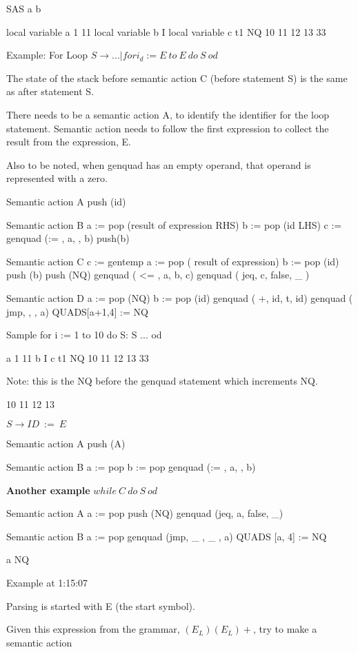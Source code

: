 \documentclass[11pt]{article}
\begin{document}
SAS
a
b

local variable a 	1	11
local variable b	I 
local variable c  	t1
NQ	10 	11	12	13	33




Example: For Loop
$S \to ... | for i_d := E\ to\ E\ do\ S\ od$

The state of the stack before semantic action C (before statement S) is the same as after statement S.  

There needs to be a semantic action A, to identify the identifier for the loop statement.   Semantic action needs to follow the first expression to collect the result from the expression, E.  

Also to be noted, when genquad has an empty operand, that operand is represented with a zero.  

Semantic action A
push (id)

Semantic action B
a := pop (result of expression RHS)
b := pop (id LHS)
c := genquad (:= , a,  , b)
push(b)
 
Semantic action C
c := gentemp 
a := pop ( result of expression) 
b := pop (id)
push (b)
push (NQ)
genquad ( <= , a, b, c)
genquad ( jeq, c, false, \_ )

Semantic action D
a := pop (NQ)
b := pop (id)
genquad ( +, id, t, id)
genquad ( jmp, , , a)
QUADS[a+1,4] := NQ 

Sample
for i := 1 to 10 do
	S: S ... od

a 	1	11
b	I 
c  	t1
NQ	10 	11	12	13	33

Note: this is the NQ before the genquad statement which increments NQ.

10 11 12 13

$S \to ID\ :=\  E$

Semantic action A
push (A)


Semantic action B
a := pop
b := pop
genquad (:= , a, , b)

\textbf {\Large Another example } $while\  C\ do \ S \ od$

Semantic action A
a := pop
push (NQ)
genquad (jeq, a, false, \_)

Semantic action B
a := pop
genquad (jmp, \_ , \_ , a)
QUADS [a, 4] := NQ

a
NQ

Example at 1:15:07


Parsing is started with E (the start symbol).

Given this expression from the grammar,  $(E_L) (E_L) + $, try to make a semantic action
 
\end{document}

